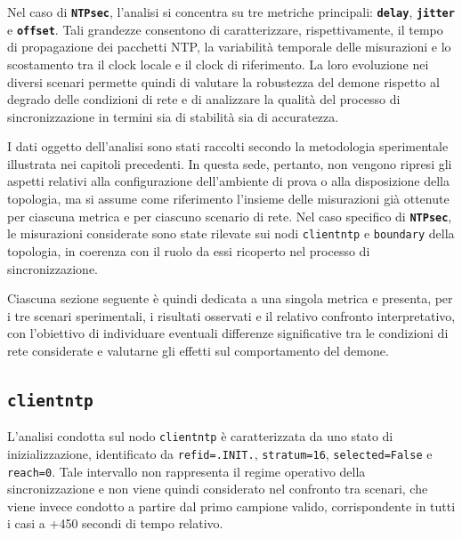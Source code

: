 Nel caso di \texttt{\textbf{NTPsec}}, l’analisi si concentra su tre metriche
principali: \texttt{\textbf{delay}}, \texttt{\textbf{jitter}} e \texttt{\textbf{offset}}.
Tali grandezze consentono di caratterizzare, rispettivamente, il tempo di
propagazione dei pacchetti NTP, la variabilità temporale delle misurazioni e lo scostamento
tra il clock locale e il clock di riferimento. La loro evoluzione nei diversi
scenari permette quindi di valutare la robustezza del demone rispetto al degrado
delle condizioni di rete e di analizzare la qualità del processo di
sincronizzazione in termini sia di stabilità sia di accuratezza.

I dati oggetto dell’analisi sono stati raccolti secondo la metodologia
sperimentale illustrata nei capitoli precedenti. In questa sede, pertanto, non vengono
ripresi gli aspetti relativi alla configurazione dell’ambiente di prova o alla disposizione
della topologia, ma si assume come riferimento l’insieme delle misurazioni già
ottenute per ciascuna metrica e per ciascuno scenario di rete. Nel caso specifico
di \texttt{\textbf{NTPsec}}, le misurazioni considerate sono state rilevate sui nodi
\texttt{clientntp} e \texttt{boundary} della topologia, in coerenza con il ruolo
da essi ricoperto nel processo di sincronizzazione.

Ciascuna sezione seguente è quindi dedicata a una singola metrica e presenta, per
i tre scenari sperimentali, i risultati osservati e il relativo confronto
interpretativo, con l’obiettivo di individuare eventuali differenze significative
tra le condizioni di rete considerate e valutarne gli effetti sul comportamento del
demone.

\subsection{\texttt{clientntp}}
L'analisi condotta sul nodo \texttt{clientntp} è caratterizzata da uno stato di
inizializzazione, identificato da \texttt{refid=.INIT.}, \texttt{stratum=16}, \texttt{selected=False}
e \texttt{reach=0}. Tale intervallo non rappresenta il regime operativo della
sincronizzazione e non viene quindi considerato nel confronto tra scenari, che viene
invece condotto a partire dal primo campione valido, corrispondente in tutti i
casi a +450 secondi di tempo relativo.
